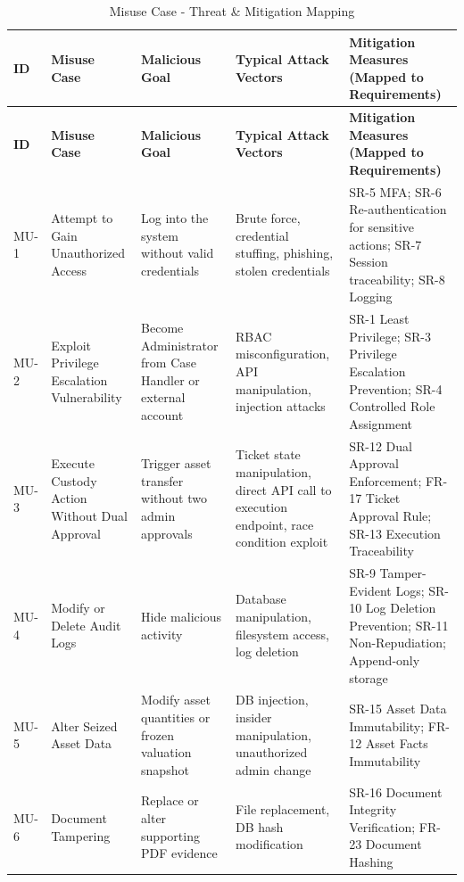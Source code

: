 \documentclass[12pt,a4paper]{report}
\begin{document}
\begin{longtable}{|p{1.2cm}|p{3.0cm}|p{3.0cm}|p{3.5cm}|p{3.6cm}|}
\caption{Misuse Case - Threat \& Mitigation Mapping}
\\\hline
\textbf{ID} & \textbf{Misuse Case} & \textbf{Malicious Goal} & \textbf{Typical Attack Vectors} & \textbf{Mitigation Measures (Mapped to Requirements)} \\
\hline
\endfirsthead
\hline
\textbf{ID} & \textbf{Misuse Case} & \textbf{Malicious Goal} & \textbf{Typical Attack Vectors} & \textbf{Mitigation Measures (Mapped to Requirements)} \\
\hline
\endhead

MU-1 & Attempt to Gain Unauthorized Access & Log into the system without valid credentials & Brute force, credential stuffing, phishing, stolen credentials & SR-5 MFA; SR-6 Re-authentication for sensitive actions; SR-7 Session traceability; SR-8 Logging \\
\hline

MU-2 & Exploit Privilege Escalation Vulnerability & Become Administrator from Case Handler or external account & RBAC misconfiguration, API manipulation, injection attacks & SR-1 Least Privilege; SR-3 Privilege Escalation Prevention; SR-4 Controlled Role Assignment \\
\hline

MU-3 & Execute Custody Action Without Dual Approval & Trigger asset transfer without two admin approvals & Ticket state manipulation, direct API call to execution endpoint, race condition exploit & SR-12 Dual Approval Enforcement; FR-17 Ticket Approval Rule; SR-13 Execution Traceability \\
\hline

MU-4 & Modify or Delete Audit Logs & Hide malicious activity & Database manipulation, filesystem access, log deletion & SR-9 Tamper-Evident Logs; SR-10 Log Deletion Prevention; SR-11 Non-Repudiation; Append-only storage \\
\hline

MU-5 & Alter Seized Asset Data & Modify asset quantities or frozen valuation snapshot & DB injection, insider manipulation, unauthorized admin change & SR-15 Asset Data Immutability; FR-12 Asset Facts Immutability \\
\hline

MU-6 & Document Tampering & Replace or alter supporting PDF evidence & File replacement, DB hash modification & SR-16 Document Integrity Verification; FR-23 Document Hashing \\
\hline


\end{longtable}
\end{document}
